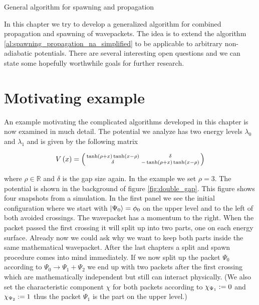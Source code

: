 \begin{chapter}{General algorithm for spawning and propagation}
\label{ch:spawncrossgeneral}

In this chapter we try to develop a generalized algorithm for combined
propagation and spawning of wavepackets. The idea is to extend the algorithm
\ref{al:spawning_propagation_na_simplified} to be applicable to arbitrary
non-adiabatic potentials. There are several interesting open questions and
we can state some hopefully worthwhile goals for further research.

\section{Motivating example}

An example motivating the complicated algorithms developed in this chapter is now
examined in much detail. The potential we analyze has two energy levels $\lambda_0$
and $\lambda_1$ and is given by the following matrix

\begin{equation*}
  V\left( x \right) =
  \left(\begin{smallmatrix}
  \tanh\left( \rho + x \right) \tanh\left( x - \rho \right) & \delta\\
  \delta                                  & - \tanh\left( \rho + x \right) \tanh\left( x - \rho \right)
  \end{smallmatrix}\right)
\end{equation*}

where $\rho \in \mathbb{R}$ and $\delta$ is the gap size again. In the example
we set $\rho=3$. The potential is shown in the background of figure \ref{fig:double_gap}.
This figure shows four snapshots from a simulation. In the first panel we see the
initial configuration where we start with $\Ket{\Psi_0} = \phi_0$ on the upper level
and to the left of both avoided crossings. The wavepacket has a momentum to the
right. When the packet passed the first crossing it will split up into two parts,
one on each energy surface. Already now we could ask why we want to keep both
parts inside the same mathematical wavepacket. After the last chapters a split
and spawn procedure comes into mind immediately. If we now split up the packet
$\Psi_0$ according to $\Psi_0 \rightarrow \Psi_1 + \Psi_2$ we end up with two
packets after the first crossing which are mathematically independent but still
can interact physically. (We also set the characteristic component $\chi$ for both
packets according to $\chi_{\Psi_1} := 0$ and $\chi_{\Psi_2} := 1$ thus
the packet $\Psi_1$ is the part on the upper level.)


\end{chapter}
